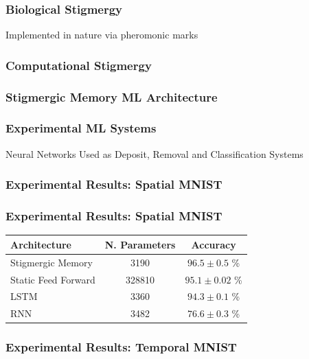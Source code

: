 \documentclass{beamer}
\begin{document}
\begin{frame}
    \frametitle{Biological Stigmergy}
    \begin{center}
        Implemented in nature via pheromonic marks 
    \end{center}
    \pause
    
\end{frame}

\begin{frame}
    \frametitle{Computational Stigmergy}
    
\end{frame}

\begin{frame}
    \frametitle{Stigmergic Memory ML Architecture}
    
\end{frame}

\begin{frame}
    \frametitle{Experimental ML Systems}
    Neural Networks Used as Deposit, Removal and Classification Systems
    \vspace{1.5cm}
    
\end{frame}

\begin{frame}
    \frametitle{Experimental Results: Spatial MNIST}
    
\end{frame}

\begin{frame}
    \frametitle{Experimental Results: Spatial MNIST}
    \begin{table}
        \begin{tabular}{l | c | c}
            Architecture & N. Parameters & Accuracy \\
            \hline
            Stigmergic Memory & 3190 & $96.5 \pm 0.5$ \% \\
            Static Feed Forward & 328810 & $95.1 \pm 0.02$ \% \\
            LSTM & 3360 & $94.3 \pm 0.1$ \% \\
            RNN & 3482 & $76.6 \pm 0.3$ \% \\
        \end{tabular}
    \end{table}
\end{frame}

\begin{frame}
    \frametitle{Experimental Results: Temporal MNIST}
    
\end{frame}
\end{document}
